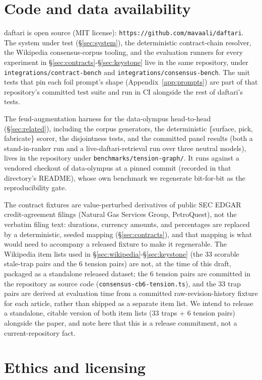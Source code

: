\documentclass[11pt]{article}
\begin{document}
\section*{Code and data availability}

daftari is open source (MIT license): \texttt{https://github.com/mavaali/daftari}. The system under
test (\S\ref{sec:system}), the deterministic contract-chain resolver, the Wikipedia consensus-corpus tooling,
and the evaluation runners for every experiment in \S\ref{sec:contracts}-\S\ref{sec:keystone} live in the same repository, under
\texttt{integrations/contract-bench} and \texttt{integrations/consensus-bench}. The unit tests that pin
each foil prompt's shape (Appendix~\ref{app:prompts}) are part of that repository's committed test suite and
run in CI alongside the rest of daftari's tests.

The feud-augmentation harness for the data-olympus head-to-head (\S\ref{sec:related}), including the corpus
generators, the deterministic \{surface, pick, fabricate\} scorer, the disjointness tests, and the
committed panel results (both a stand-in-ranker run and a live-daftari-retrieval run over three
neutral models), lives in the repository under \texttt{benchmarks/tension-graph/}. It runs against a
vendored checkout of data-olympus at a pinned commit (recorded in that directory's README), whose
own benchmark we regenerate bit-for-bit as the reproducibility gate.

The contract fixtures are value-perturbed derivatives of public SEC EDGAR credit-agreement
filings (Natural Gas Services Group, PetroQuest), not the verbatim filing text: durations,
currency amounts, and percentages are replaced by a deterministic, seeded mapping (\S\ref{sec:contracts}), and
that mapping is what would need to accompany a released fixture to make it regenerable. The
Wikipedia item lists used in \S\ref{sec:wikipedia}-\S\ref{sec:keystone} (the 33 scorable stale-trap pairs and the 6 tension pairs)
are not, at the time of this draft, packaged as a standalone released dataset; the 6 tension
pairs are committed in the repository as source code (\texttt{consensus-cb6-tension.ts}), and the 33
trap pairs are derived at evaluation time from a committed raw-revision-history fixture for
each article, rather than shipped as a separate item list. We intend to release a standalone,
citable version of both item lists (33 traps + 6 tension pairs) alongside the paper, and note
here that this is a release commitment, not a current-repository fact.

\section*{Ethics and licensing}
\end{document}
